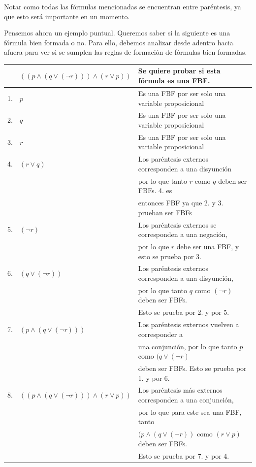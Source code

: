 Notar como todas las fórmulas mencionadas se encuentran entre paréntesis, ya que
esto será importante en un momento.

Pensemos ahora un ejemplo puntual. Queremos saber si la siguiente es una fórmula
bien formada o no. Para ello, debemos analizar desde adentro hacia afuera para
ver si se sumplen las reglas de formación de fórmulas bien formadas.

\begin{tabular}{l l l}
    & $((p \land (q \lor (\lnot r))) \land (r \lor p))$ & Se quiere probar si
    esta fórmula es una FBF.\\
    \hline
    1. & $p$ & Es una FBF por ser solo una variable proposicional\\
    2. & $q$ & Es una FBF por ser solo una variable proposicional\\
    3. & $r$  & Es una FBF por ser solo una variable proposicional\\
    4. & $(r \lor q)$ & Los paréntesis externos corresponden a una disyunción \\
    &&                  por lo que tanto $r$ como $q$ deben ser FBFs. 4. es\\
    &&                  entonces FBF ya que 2. y 3. prueban ser FBFs\\
    5. & $(\lnot r)$ &  Los paréntesis externos se corresponden a una
    negación,\\
    &&                  por lo que $r$ debe ser una FBF, y esto se prueba por
    3.\\
    6. & $(q \lor (\lnot r))$  & Los paréntesis externos corresponden a una
    disyunción,\\
    &&                           por lo que tanto $q$ como $(\lnot r)$ deben ser
    FBFs.\\
    &&                           Esto se prueba por 2. y por 5.\\
    7. & $(p \land (q \lor (\lnot r)))$ & Los paréntesis externos vuelven a
    corresponder a\\
    &&                           una conjunción, por lo que tanto $p$ como $(q
    \lor (\lnot r)$\\
    &&                           deben ser FBFs. Esto se prueba por 1. y por
    6.\\
    8. & $((p \land (q \lor (\lnot r))) \land (r \lor p))$ & Los paréntesis más
    externos corresponden a una conjunción,\\
    &&por lo que para este sea una FBF, tanto\\
    && $(p \land (q \lor (\lnot r))$ como $(r \lor p)$ deben ser FBFs.\\
    && Esto se prueba por 7. y por 4.
\end{tabular}

